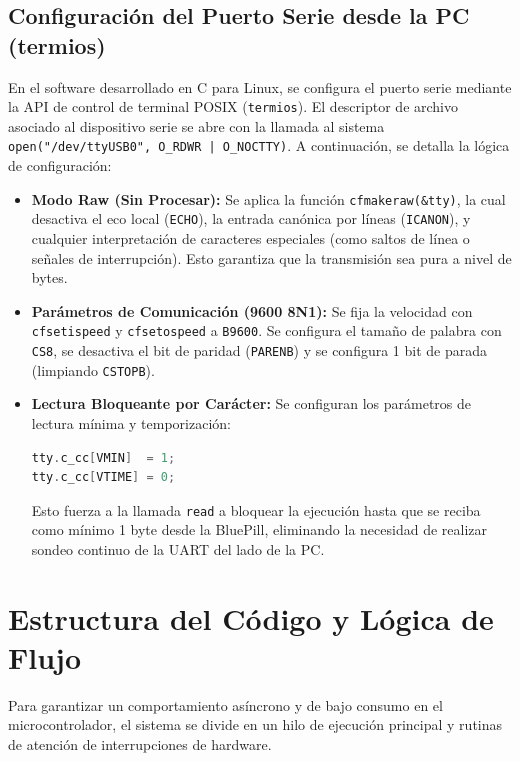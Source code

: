 \documentclass{plantilla}
\begin{document}
\subsection{Configuración del Puerto Serie desde la PC (termios)}
En el software desarrollado en C para Linux, se configura el puerto serie mediante la API de control de terminal POSIX (\texttt{termios}). El descriptor de archivo asociado al dispositivo serie se abre con la llamada al sistema \texttt{open("/dev/ttyUSB0", O\_RDWR | O\_NOCTTY)}. A continuación, se detalla la lógica de configuración:
\begin{itemize}
    \item \textbf{Modo Raw (Sin Procesar):} Se aplica la función \texttt{cfmakeraw(\&tty)}, la cual desactiva el eco local (\texttt{ECHO}), la entrada canónica por líneas (\texttt{ICANON}), y cualquier interpretación de caracteres especiales (como saltos de línea o señales de interrupción). Esto garantiza que la transmisión sea pura a nivel de bytes.
    \item \textbf{Parámetros de Comunicación (9600 8N1):} Se fija la velocidad con \texttt{cfsetispeed} y \texttt{cfsetospeed} a \texttt{B9600}. Se configura el tamaño de palabra con \texttt{CS8}, se desactiva el bit de paridad (\texttt{PARENB}) y se configura 1 bit de parada (limpiando \texttt{CSTOPB}).
    \item \textbf{Lectura Bloqueante por Carácter:} Se configuran los parámetros de lectura mínima y temporización:
    \begin{lstlisting}[language=C]
tty.c_cc[VMIN]  = 1;
tty.c_cc[VTIME] = 0;
    \end{lstlisting}
    Esto fuerza a la llamada \texttt{read} a bloquear la ejecución hasta que se reciba como mínimo 1 byte desde la BluePill, eliminando la necesidad de realizar sondeo continuo de la UART del lado de la PC.
\end{itemize}

\section{Estructura del Código y Lógica de Flujo}
Para garantizar un comportamiento asíncrono y de bajo consumo en el microcontrolador, el sistema se divide en un hilo de ejecución principal y rutinas de atención de interrupciones de hardware.
\end{document}
